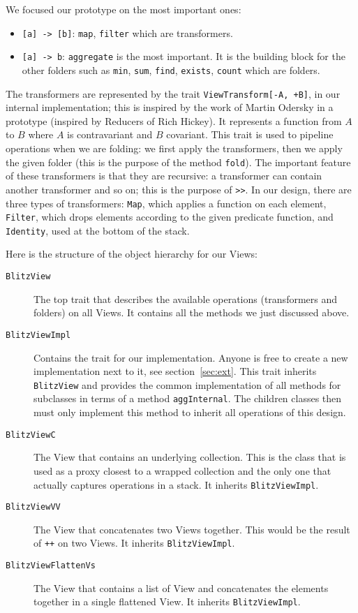 \documentclass[a4paper,12pt,twocolumn]{article}
\begin{document}
We focused our prototype on the most important ones:
\begin{itemize}
    \item \verb|[a] -> [b]|: \verb|map|, \verb|filter| which are transformers.
    \item \verb|[a] -> b|: \verb|aggregate| is the most important. It is the building block for the other folders such as \verb|min|, \verb|sum|, \verb|find|, \verb|exists|, \verb|count| which are folders.
\end{itemize}

The transformers are represented by the trait \verb|ViewTransform[-A, +B]|, in our internal implementation; this is inspired by the work of Martin Odersky in a prototype \cite{martin-view-prototype} (inspired by Reducers of Rich Hickey\cite{hickey-reducers}). %
It represents a function from $A$ to $B$ where $A$ is contravariant and $B$ covariant.
This trait is used to pipeline operations when we are folding: we first apply the transformers, then we apply the given folder (this is the purpose of the method \verb|fold|).
The important feature of these transformers is that they are recursive: a transformer can contain another transformer and so on; this is the purpose of \verb|>>|.
In our design, there are three types of transformers: \verb|Map|, which applies a function on each element, \verb|Filter|, which drops elements according to the given predicate function, and \verb|Identity|, used at the bottom of the stack.

Here is the structure of the object hierarchy for our Views:
\begin{description}
    \item[{\tt BlitzView}] The top trait that describes the available operations (transformers and folders) on all Views.
        It contains all the methods we just discussed above.
    \item[{\tt BlitzViewImpl}] Contains the trait for our implementation.
        Anyone is free to create a new implementation next to it, see section~\ref{sec:ext}.
        This trait inherits \verb|BlitzView| and provides the common implementation of all methods for subclasses in terms of a method \verb|aggInternal|.
        The children classes then must only implement this method to inherit all operations of this design.
    \item[{\tt BlitzViewC}] The View that contains an underlying collection.
        This is the class that is used as a proxy closest to a wrapped collection and the only one that actually captures operations in a stack.
        It inherits \verb|BlitzViewImpl|.
    \item[{\tt BlitzViewVV}] The View that concatenates two Views together.
        This would be the result of \verb|++| on two Views.
        It inherits \verb|BlitzViewImpl|.
    \item[{\tt BlitzViewFlattenVs}] The View that contains a list of View and concatenates the elements together in a single flattened View.
        It inherits \verb|BlitzViewImpl|.
\end{description}
\end{document}
